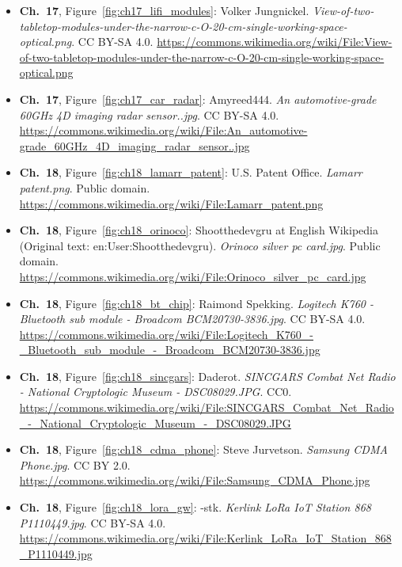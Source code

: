 \begin{small}
\begin{itemize}[leftmargin=0pt,itemsep=2pt,label={}]
\item \textbf{Ch.~17}, Figure~\ref{fig:ch17_lifi_modules}: Volker Jungnickel. \emph{View-\allowbreak{}of-\allowbreak{}two-\allowbreak{}tabletop-\allowbreak{}modules-\allowbreak{}under-\allowbreak{}the-\allowbreak{}narrow-\allowbreak{}c-\allowbreak{}O-\allowbreak{}20-\allowbreak{}cm-\allowbreak{}single-\allowbreak{}working-\allowbreak{}space-\allowbreak{}optical.\allowbreak{}png}. CC BY-SA 4.0. \url{https://commons.wikimedia.org/wiki/File:View-of-two-tabletop-modules-under-the-narrow-c-O-20-cm-single-working-space-optical.png}
\item \textbf{Ch.~17}, Figure~\ref{fig:ch17_car_radar}: Amyreed444. \emph{An automotive-\allowbreak{}grade 60GHz 4D imaging radar sensor.\allowbreak{}.\allowbreak{}jpg}. CC BY-SA 4.0. \url{https://commons.wikimedia.org/wiki/File:An_automotive-grade_60GHz_4D_imaging_radar_sensor..jpg}
\item \textbf{Ch.~18}, Figure~\ref{fig:ch18_lamarr_patent}: U.S. Patent Office. \emph{Lamarr patent.\allowbreak{}png}. Public domain. \url{https://commons.wikimedia.org/wiki/File:Lamarr_patent.png}
\item \textbf{Ch.~18}, Figure~\ref{fig:ch18_orinoco}: Shootthedevgru at English Wikipedia (Original text: en:User:Shootthedevgru). \emph{Orinoco silver pc card.\allowbreak{}jpg}. Public domain. \url{https://commons.wikimedia.org/wiki/File:Orinoco_silver_pc_card.jpg}
\item \textbf{Ch.~18}, Figure~\ref{fig:ch18_bt_chip}: Raimond Spekking. \emph{Logitech K760 -\allowbreak{} Bluetooth sub module -\allowbreak{} Broadcom BCM20730-\allowbreak{}3836.\allowbreak{}jpg}. CC BY-SA 4.0. \url{https://commons.wikimedia.org/wiki/File:Logitech_K760_-_Bluetooth_sub_module_-_Broadcom_BCM20730-3836.jpg}
\item \textbf{Ch.~18}, Figure~\ref{fig:ch18_sincgars}: Daderot. \emph{SINCGARS Combat Net Radio -\allowbreak{} National Cryptologic Museum -\allowbreak{} DSC08029.\allowbreak{}JPG}. CC0. \url{https://commons.wikimedia.org/wiki/File:SINCGARS_Combat_Net_Radio_-_National_Cryptologic_Museum_-_DSC08029.JPG}
\item \textbf{Ch.~18}, Figure~\ref{fig:ch18_cdma_phone}: Steve Jurvetson. \emph{Samsung CDMA Phone.\allowbreak{}jpg}. CC BY 2.0. \url{https://commons.wikimedia.org/wiki/File:Samsung_CDMA_Phone.jpg}
\item \textbf{Ch.~18}, Figure~\ref{fig:ch18_lora_gw}: -stk. \emph{Kerlink LoRa IoT Station 868 P1110449.\allowbreak{}jpg}. CC BY-SA 4.0. \url{https://commons.wikimedia.org/wiki/File:Kerlink_LoRa_IoT_Station_868_P1110449.jpg}

\end{itemize}
\end{small}
